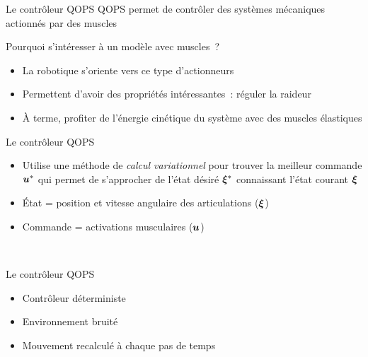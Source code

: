 \begin{frame}{Le contrôleur QOPS}
    QOPS permet de contrôler des systèmes mécaniques actionnés par des muscles
    ~\\
    \begin{block}{Pourquoi s'intéresser à un modèle avec muscles~?}
        \begin{itemize}
            \item La robotique s'oriente vers ce type d'actionneurs
            \item Permettent d'avoir des propriétés intéressantes~: réguler la raideur
            \item À terme, profiter de l'énergie cinétique du système avec des muscles élastiques
        \end{itemize}
    \end{block}
\end{frame}

\begin{frame}{Le contrôleur QOPS}
    \begin{itemize}
        \item Utilise une méthode de {\em calcul variationnel} pour trouver la meilleur commande $\boldsymbol{u}^*$ qui permet de s'approcher de l'état désiré $\boldsymbol{\xi}^*$ connaissant l'état courant $\boldsymbol{\xi}$
        \item État = position et vitesse angulaire des articulations ($\boldsymbol{\xi}$)
        \item Commande = activations musculaires ($\boldsymbol{u}$)
    \end{itemize}
    ~\\
    \begin{figure}
        \centering
        
    \end{figure}
\end{frame}

\begin{frame}{Le contrôleur QOPS}
    \begin{itemize}
        \item Contrôleur déterministe
        \item Environnement bruité
        \item Mouvement recalculé à chaque pas de temps
    \end{itemize}
    \begin{figure}
        \centering
        
    \end{figure}
\end{frame}

